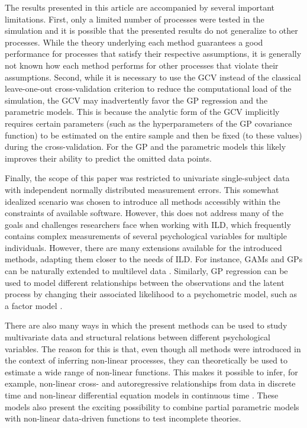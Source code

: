 \documentclass[man, floatsintext]{apa7}
\begin{document}
The results presented in this article are accompanied by several important
limitations. First, only a limited number of processes were tested in the
simulation and it is possible that the presented results do not generalize to
other processes. While the theory underlying each method guarantees a good
performance for processes that satisfy their respective assumptions, it is
generally not known how each method performs for other processes that violate
their assumptions. Second, while it is necessary to use the GCV instead of the
classical leave-one-out cross-validation criterion to reduce the computational
load of the simulation, the GCV may inadvertently favor the GP regression and
the parametric models. This is because the analytic form of the GCV
implicitly requires certain parameters (such as the hyperparameters of the GP
covariance function) to be estimated on the entire sample and then be fixed (to
these values) during the cross-validation. For the GP and the parametric models
this likely improves their ability to predict the omitted data points.

Finally, the scope of this paper was restricted to univariate single-subject
data with independent normally distributed measurement errors. This somewhat
idealized scenario was chosen to introduce all methods accessibly within the
constraints of available software. However, this does not address many of the
goals and challenges researchers face when working with ILD, which
frequently contains complex measurements of several psychological variables for
multiple individuals. However, there are many extensions available for the
introduced methods, adapting them closer to the needs of ILD\@. For instance,
GAMs and GPs can be naturally extended to multilevel data
\parencite{karch_gaussian_2020, wood_generalized_2006}. Similarly, GP
regression can be used to model different relationships between the
observations and the latent process by changing their associated likelihood to
a psychometric model, such as a factor model \parencite{clark_dynamic_2023,
  yu_gaussian-process_2009}.

There are also many ways in which the present methods can be used to study
multivariate data and structural relations between different psychological
variables. The reason for this is that, even though all methods were introduced
in the context of inferring non-linear processes, they can theoretically be
used to estimate a wide range of non-linear functions. This makes it possible
to infer, for example, non-linear cross- and autoregressive relationships from
data in discrete time \parencite{bringmann_modeling_2015,
  wood_generalized_2006, rasmussen_gaussian_2006,
  eleftheriadis_identification_2017} and non-linear differential equation
models
in continuous time \parencite{yildiz_learning_2018}. These models also present
the exciting possibility to combine partial parametric models with non-linear
data-driven functions to test incomplete theories.
\end{document}
